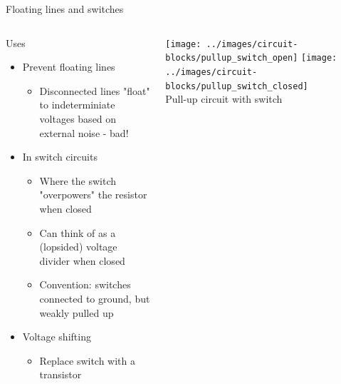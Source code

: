 \documentclass{beamer}
\begin{document}
\begin{frame}{Floating lines and switches}
  \begin{columns}[T]
    \begin{column}{.6\textwidth}
	  Uses
      \begin{itemize}
        \item Prevent floating lines
        \begin{itemize}
          \item Disconnected lines "float" to indeterminiate voltages based on external noise - bad!
        \end{itemize}
        \item In switch circuits
        \begin{itemize}
          \item Where the switch "overpowers" the resistor when closed
          \item Can think of as a (lopsided) voltage divider when closed
          \item Convention: switches connected to ground, but weakly pulled up
        \end{itemize}
        \item Voltage shifting
        \begin{itemize}
          \item Replace switch with a transistor
        \end{itemize}
      \end{itemize}
    \end{column}

    \begin{column}{0.4\textwidth} \centering
      \texttt{[image: ../images/circuit-blocks/pullup\_switch\_open]}
      \texttt{[image: ../images/circuit-blocks/pullup\_switch\_closed]} \\
      Pull-up circuit with switch
    \end{column}
  \end{columns}
\end{frame}
\end{document}
